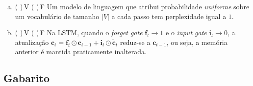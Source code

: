 \documentclass{dlproblemset}
\begin{document}
\begin{enumerate}[I)]
\begin{enumerate}[a)]
        \item ( )\,V \quad ( )\,F \quad Um modelo de linguagem que atribui probabilidade \emph{uniforme} sobre um vocabulário de tamanho $|V|$ a cada passo tem perplexidade igual a $1$.

        \item ( )\,V \quad ( )\,F \quad Na LSTM, quando o \textit{forget gate} $\mathbf{f}_t \to 1$ e o \textit{input gate} $\mathbf{i}_t \to 0$, a atualização $\mathbf{c}_t = \mathbf{f}_t \odot \mathbf{c}_{t-1} + \mathbf{i}_t \odot \tilde{\mathbf{c}}_t$ reduz-se a $\mathbf{c}_{t-1}$, ou seja, a memória anterior é mantida praticamente inalterada.
    \end{enumerate}

\end{enumerate}

\newpage
\subsection*{Gabarito}
\color{blue}
\end{document}
